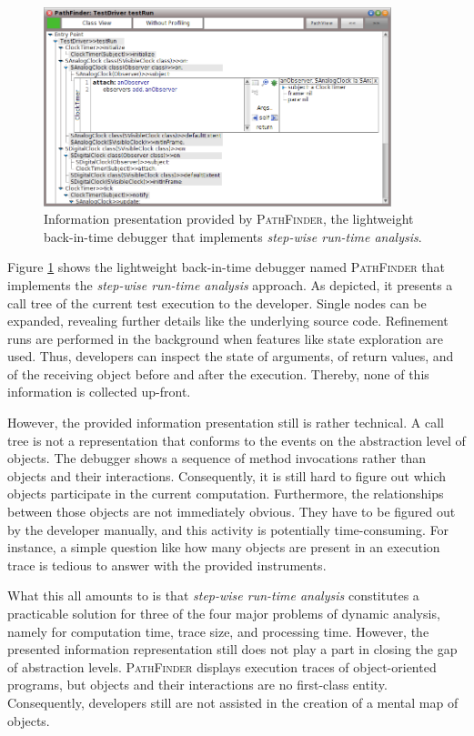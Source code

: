 \begin{figure}[tb]
	\centering
	\includegraphics[width=0.9\textwidth]{../images/02-TracingPathFinder}
	\caption[Information Presentation Provided by PathFinder]{Information presentation provided by \textsc{PathFinder}, the lightweight back-in-time debugger that implements \emph{step-wise run-time analysis}.}
	\label{fig:BackgroundPathFinder}
\end{figure}

Figure \ref{fig:BackgroundPathFinder} shows the lightweight back-in-time debugger named \textsc{PathFinder} that implements the \emph{step-wise run-time analysis} approach.
As depicted, it presents a call tree of the current test execution to the developer.
Single nodes can be expanded, revealing further details like the underlying source code.
Refinement runs are performed in the background when features like state exploration are used.
Thus, developers can inspect the state of arguments, of return values, and of the receiving object before and after the execution.
Thereby, none of this information is collected up-front.

However, the provided information presentation still is rather technical.
A call tree is not a representation that conforms to the events on the abstraction level of objects.
The debugger shows a sequence of method invocations rather than objects and their interactions.
Consequently, it is still hard to figure out which objects participate in the current computation.
Furthermore, the relationships between those objects are not immediately obvious.
They have to be figured out by the developer manually, and this activity is potentially time-consuming.
For instance, a simple question like how many objects are present in an execution trace is tedious to answer with the provided instruments.

What this all amounts to is that \emph{step-wise run-time analysis} constitutes a practicable solution for three of the four major problems of dynamic analysis, namely for computation time, trace size, and processing time.
However, the presented information representation still does not play a part in closing the gap of abstraction levels.
\textsc{PathFinder} displays execution traces of object-oriented programs, but objects and their interactions are no first-class entity.
Consequently, developers still are not assisted in the creation of a mental map of objects.

